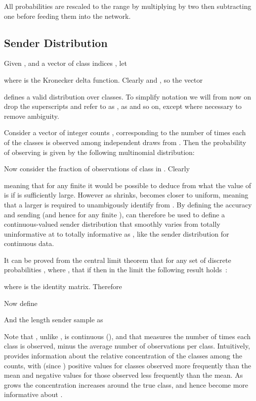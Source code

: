 \documentclass[11pt,table]{article}
\newcommand{\0}[1]{\constvec{0}{#1}}
\newcommand{\1}[1]{\constvec{1}{#1}}
\begin{document}
All probabilities are rescaled to the range  by multiplying by two then subtracting one before feeding them into the network.
\subsection{Sender Distribution \texorpdfstring{}{}}\label{sec:disc_sender}
Given , and a vector of  class indices , let

where  is the Kronecker delta function.
Clearly  and , so the vector

defines a valid distribution over  classes.
To simplify notation we will from now on drop the superscripts and refer to  as ,  as  and so on, except where necessary to remove ambiguity.

Consider a vector of integer counts , corresponding to the number of times each of the  classes is observed among  independent draws from .
Then the probability of observing  is given by the following multinomial distribution:

Now consider the fraction  of observations of class  in .
Clearly

meaning that for any finite  it would be possible to deduce from  what the value of  is if  is sufficiently large.
However as  shrinks,  becomes closer to uniform, meaning that a larger  is required to unambigously identify  from . 
By defining the accuracy  and sending  (and hence  for any finite ),  can therefore be used to define a continuous-valued sender distribution that smoothly varies from totally uninformative at  to totally informative as , like the sender distribution for continuous data.

It can be proved from the central limit theorem that for any set of discrete probabilities , where  , that if  then in the limit  the following result holds~\cite{georgii2008stochastics}:

where  is the  identity matrix.
Therefore

Now define

And the length  sender sample  as

Note that , unlike , is continuous (), and that  measures the number of times each class is observed, minus the average number of observations per class.
Intuitively,  provides information about the relative concentration of the classes among the counts, with (since ) positive values for classes observed more frequently than the mean and negative values for those observed less frequently than the mean. 
As  grows the concentration increases around the true class, and hence  become more informative about .
\end{document}
